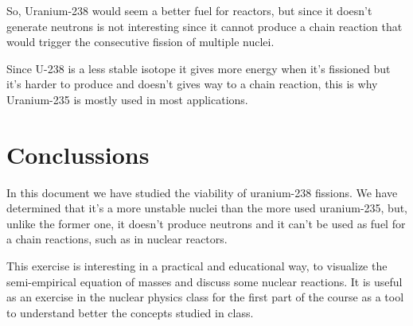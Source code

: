 \documentclass{article} %
\begin{document}
So, Uranium-238 would seem a better fuel for reactors, but since it doesn't generate neutrons is not interesting since it cannot produce a chain reaction that would trigger the consecutive fission of multiple nuclei.

Since U-238 is a less stable isotope it gives more energy when it's fissioned but it's harder to produce and doesn't gives way to a chain reaction, this is why Uranium-235 is mostly used in most applications.

\section{Conclussions}

In this document we have studied the viability of uranium-238 fissions. We have determined that it's a more unstable nuclei than the more used uranium-235, but, unlike the former one, it doesn't produce neutrons and it can't be used as fuel for a chain reactions, such as in nuclear reactors.

This exercise is interesting in a practical and educational way, to visualize the semi-empirical equation of masses and discuss some nuclear reactions. It is useful as an exercise in the nuclear physics class for the first part of the course as a tool to understand better the concepts studied in class.
\end{document}
